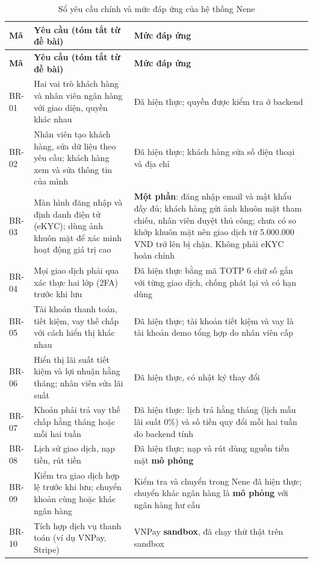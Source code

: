 {\small
\begin{longtable}{>{\raggedright\arraybackslash}p{}>{\raggedright\arraybackslash}p{}>{\raggedright\arraybackslash}p{}}
\caption{Sổ yêu cầu chính và mức đáp ứng của hệ thống Nene}\label{tab:ch2-br}\\
\toprule
\textbf{Mã} & \textbf{Yêu cầu (tóm tắt từ đề bài)} & \textbf{Mức đáp ứng} \\
\midrule
\endfirsthead
\toprule
\textbf{Mã} & \textbf{Yêu cầu (tóm tắt từ đề bài)} & \textbf{Mức đáp ứng} \\
\midrule
\endhead
\bottomrule
\endfoot
BR-01 & Hai vai trò khách hàng và nhân viên ngân hàng với giao diện, quyền khác nhau & Đã hiện thực; quyền được kiểm tra ở backend \\
BR-02 & Nhân viên tạo khách hàng, sửa dữ liệu theo yêu cầu; khách hàng xem và sửa thông tin của mình & Đã hiện thực; khách hàng sửa số điện thoại và địa chỉ \\
BR-03 & Màn hình đăng nhập và định danh điện tử (eKYC); dùng ảnh khuôn mặt để xác minh hoạt động giá trị cao & \textbf{Một phần}: đăng nhập email và mật khẩu đầy đủ; khách hàng gửi ảnh khuôn mặt tham chiếu, nhân viên duyệt thủ công; chưa có so khớp khuôn mặt nên giao dịch từ 5.000.000 VND trở lên bị chặn. Không phải eKYC hoàn chỉnh \\
BR-04 & Mọi giao dịch phải qua xác thực hai lớp (2FA) trước khi lưu & Đã hiện thực bằng mã TOTP 6 chữ số gắn với từng giao dịch, chống phát lại và có hạn dùng \\
BR-05 & Tài khoản thanh toán, tiết kiệm, vay thế chấp với cách hiển thị khác nhau & Đã hiện thực; tài khoản tiết kiệm và vay là tài khoản demo tổng hợp do nhân viên cấp \\
BR-06 & Hiển thị lãi suất tiết kiệm và lợi nhuận hằng tháng; nhân viên sửa lãi suất & Đã hiện thực, có nhật ký thay đổi \\
BR-07 & Khoản phải trả vay thế chấp hằng tháng hoặc mỗi hai tuần & Đã hiện thực: lịch trả hằng tháng (lịch mẫu lãi suất 0\%) và số tiền quy đổi mỗi hai tuần do backend tính
\\
BR-08 & Lịch sử giao dịch, nạp tiền, rút tiền & Đã hiện thực; nạp và rút dùng nguồn tiền mặt \textbf{mô phỏng} \\
BR-09 & Kiểm tra giao dịch hợp lệ trước khi lưu; chuyển khoản cùng hoặc khác ngân hàng & Kiểm tra và chuyển trong Nene đã hiện thực; chuyển khác ngân hàng là \textbf{mô phỏng} với ngân hàng hư cấu \\
BR-10 & Tích hợp dịch vụ thanh toán (ví dụ VNPay, Stripe) & VNPay \textbf{sandbox}, đã chạy thử thật trên sandbox \\

\end{longtable}}
